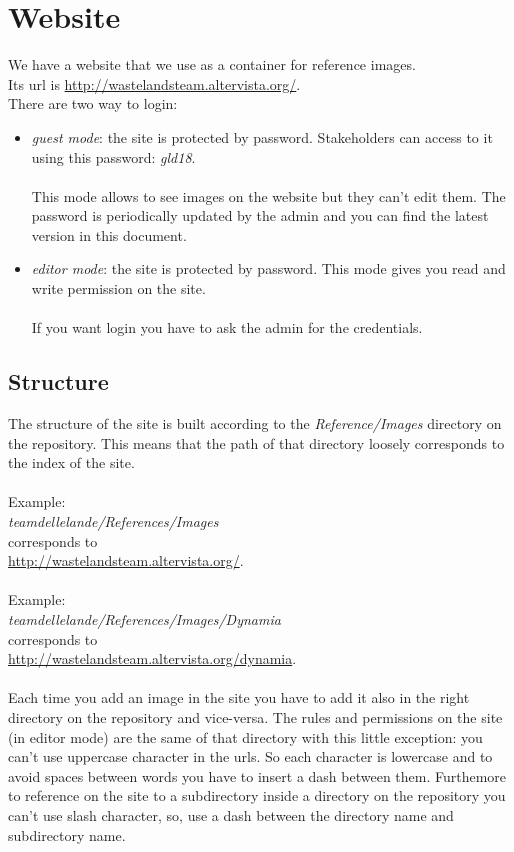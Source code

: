 \section{Website}
We have a website that we use as a container for reference images. \\Its url is \href{http://wastelandsteam.altervista.org/}{http://wastelandsteam.altervista.org/}.\\

There are two way to login: 
\begin{itemize}
\item \textit{guest mode}: the site is protected by password. Stakeholders can access to it using this password: \textit{gld18}.\\\\
  This mode allows to see images on the website but they can't edit them. The password is periodically updated by the admin and you can find the latest version in this document.
\item \textit{editor mode}: the site is protected by password. This mode gives you read and write permission on the site.\\\\
  If you want login you have to ask the admin for the credentials.
\end{itemize}

\subsection{Structure}
The structure of the site is built according to the \textit{Reference/Images} directory on the repository.
This means that the path of that directory loosely corresponds to the index of the site.\\\\
Example: \\
\textit{teamdellelande/References/Images} \\corresponds to\\ \href{http://wastelandsteam.altervista.org/}{http://wastelandsteam.altervista.org/}.\\\\
Example: \\
\textit{teamdellelande/References/Images/Dynamia} \\corresponds to\\ \href{http://wastelandsteam.altervista.org/dynamia}{http://wastelandsteam.altervista.org/dynamia}.\\\\
Each time you add an image in the site you have to add it also in the right directory on the repository and vice-versa.
The rules and permissions on the site (in editor mode) are the same of that directory with this little exception:
you can't use uppercase character in the urls. So each character is lowercase and to avoid spaces between words you have to insert a dash between them. Furthemore to reference on the site to a subdirectory inside a directory on the repository you can't use slash character, so, use a dash between the directory name and subdirectory name.

